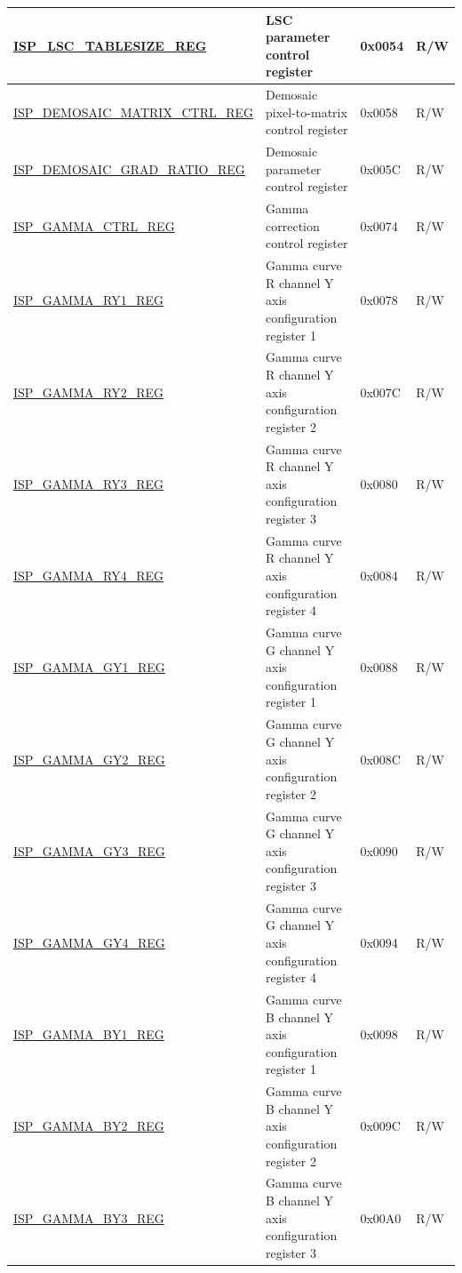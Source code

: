 \begin{longtable}{ | p{6cm} | p{7.2cm} | p{1.3cm} | p{1cm} | }
\hyperref[regdesc:ISPLSCTABLESIZEREG]{ISP\_LSC\_TABLESIZE\_REG} & LSC parameter control register & 0x0054 & R/W \\ \hline
\hyperref[regdesc:ISPDEMOSAICMATRIXCTRLREG]{ISP\_DEMOSAIC\_MATRIX\_CTRL\_REG} & Demosaic pixel-to-matrix control register & 0x0058 & R/W \\ \hline
\hyperref[regdesc:ISPDEMOSAICGRADRATIOREG]{ISP\_DEMOSAIC\_GRAD\_RATIO\_REG} & Demosaic parameter control register & 0x005C & R/W \\ \hline
\hyperref[regdesc:ISPGAMMACTRLREG]{ISP\_GAMMA\_CTRL\_REG} & Gamma correction control register & 0x0074 & R/W \\ \hline
\hyperref[regdesc:ISPGAMMARY1REG]{ISP\_GAMMA\_RY1\_REG} & Gamma curve R channel Y axis configuration register 1 & 0x0078 & R/W \\ \hline
\hyperref[regdesc:ISPGAMMARY2REG]{ISP\_GAMMA\_RY2\_REG} & Gamma curve R channel Y axis configuration register 2 & 0x007C & R/W \\ \hline
\hyperref[regdesc:ISPGAMMARY3REG]{ISP\_GAMMA\_RY3\_REG} & Gamma curve R channel Y axis configuration register 3 & 0x0080 & R/W \\ \hline
\hyperref[regdesc:ISPGAMMARY4REG]{ISP\_GAMMA\_RY4\_REG} & Gamma curve R channel Y axis configuration register 4 & 0x0084 & R/W \\ \hline
\hyperref[regdesc:ISPGAMMAGY1REG]{ISP\_GAMMA\_GY1\_REG} & Gamma curve G channel Y axis configuration register 1 & 0x0088 & R/W \\ \hline
\hyperref[regdesc:ISPGAMMAGY2REG]{ISP\_GAMMA\_GY2\_REG} & Gamma curve G channel Y axis configuration register 2 & 0x008C & R/W \\ \hline
\hyperref[regdesc:ISPGAMMAGY3REG]{ISP\_GAMMA\_GY3\_REG} & Gamma curve G channel Y axis configuration register 3 & 0x0090 & R/W \\ \hline
\hyperref[regdesc:ISPGAMMAGY4REG]{ISP\_GAMMA\_GY4\_REG} & Gamma curve G channel Y axis configuration register 4 & 0x0094 & R/W \\ \hline
\hyperref[regdesc:ISPGAMMABY1REG]{ISP\_GAMMA\_BY1\_REG} & Gamma curve B channel Y axis configuration register 1 & 0x0098 & R/W \\ \hline
\hyperref[regdesc:ISPGAMMABY2REG]{ISP\_GAMMA\_BY2\_REG} & Gamma curve B channel Y axis configuration register 2 & 0x009C & R/W \\ \hline
\hyperref[regdesc:ISPGAMMABY3REG]{ISP\_GAMMA\_BY3\_REG} & Gamma curve B channel Y axis configuration register 3 & 0x00A0 & R/W \\ \hline

\end{longtable}
